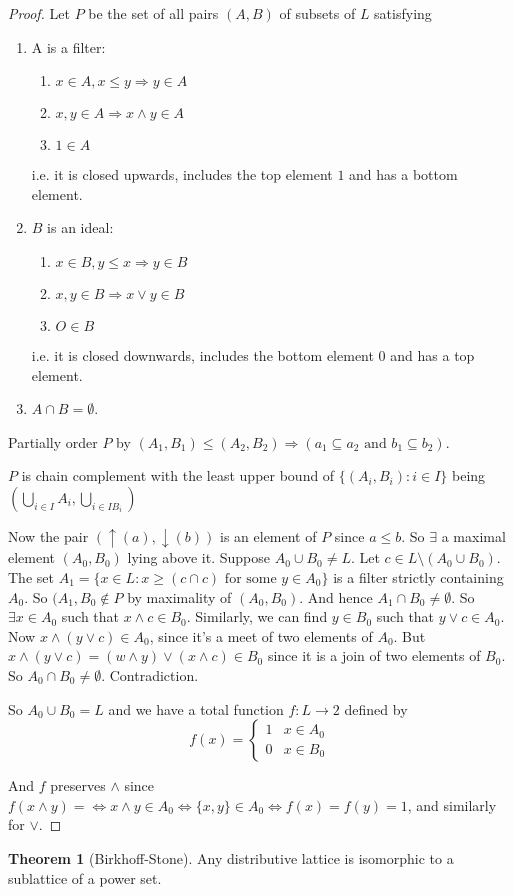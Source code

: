 \documentclass[a4paper]{article}
\theoremstyle{definition}
\newtheorem*{thm}{Theorem}
\begin{document}
\begin{proof}
  Let $P$ be the set of all pairs $(A, B)$ of subsets of $L$ satisfying
  \begin{enumerate}
  \item A is a filter: 
    \begin{enumerate}
    \item $x\in A, x\leq y\Rightarrow y\in A$
    \item $x, y\in A\Rightarrow x\wedge y \in A$
    \item $1\in A$
    \end{enumerate}
    i.e. it is closed upwards, includes the top element $1$ and has a bottom element.
  \item $B$ is an ideal:
    \begin{enumerate}
    \item $x\in B, y\leq x\Rightarrow y\in B$
    \item $x, y\in B\Rightarrow x\vee y\in B$
    \item $O\in B$
    \end{enumerate}
    i.e. it is closed downwards, includes the bottom element $0$ and has a top element.
  \item $A\cap B = \emptyset$.
  \end{enumerate}
  Partially order $P$ by $(A_1, B_1)\leq (A_2, B_2)\Rightarrow (a_1\subseteq a_2\text{ and }b_1\subseteq b_2)$.

  $P$ is chain complement with the least upper bound of $\{(A_i, B_i): i\in I\}$ being $(\bigcup_{i\in I}A_i, \bigcup_{i\in I B_i})$

  Now the pair $(\uparrow(a),\downarrow(b))$ is an element of $P$ since $a\leq b$. So $\exists$ a maximal element $(A_0, B_0)$ lying above it. Suppose $A_0\cup B_0\not= L$. Let $c\in L\setminus(A_0\cup B_0)$. The set $A_1 = \{x\in L: x\geq (c\cap c) \text{ for some }y\in A_0\}$ is a filter strictly containing $A_0$. So $(A_1, B_0\not\in P$ by maximality of $(A_0, B_0)$. And hence $A_1\cap B_0\not= \emptyset$. So $\exists x\in A_0$ such that $x\wedge c\in B_0$. Similarly, we can find $y\in B_0$ such that $y\vee c\in A_0$. Now $x\wedge(y\vee c)\in A_0$, since it's a meet of two elements of $A_0$. But $x\wedge(y\vee c) = (w\wedge y)\vee (x\wedge c)\in B_0$ since it is a join of two elements of $B_0$. So $A_0\cap B_0\not= \emptyset$. Contradiction.

  So $A_0\cup B_0 = L$ and we have a total function $f: L\to 2$ defined by
$$f(x) = 
  \begin{cases}
    1 & x\in A_0\\
    0 & x\in B_0
  \end{cases}$$

And $f$ preserves $\wedge$ since $f(x\wedge y) = \Leftrightarrow x\wedge y\in A_0 \Leftrightarrow\{x, y\}\in A_0\Leftrightarrow f(x) = f(y) = 1$, and similarly for $\vee$.
\end{proof}
\begin{thm}[Birkhoff-Stone]
  Any distributive lattice is isomorphic to a sublattice of a power set.
\end{thm}
\end{document}
